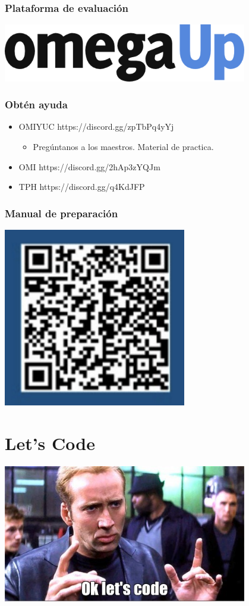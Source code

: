 \documentclass{beamer}
\begin{document}
\begin{frame}
  \frametitle{Plataforma de evaluación}
	\begin{center}
		\includegraphics[width=0.8\textwidth]{img/omegaup.png}
	\end{center}
\end{frame}

\begin{frame}
  \frametitle{Obtén ayuda}
	\begin{itemize}
		\item OMIYUC  https://discord.gg/zpTbPq4yYj 
		\begin{itemize}
			\item Pregúntanos a los maestros. Material de practica.
		\end{itemize}
		\item OMI https://discord.gg/2hAp3zYQJm
		\item TPH https://discord.gg/q4KdJFP
	\end{itemize}
\end{frame}

\begin{frame}
  \frametitle{Manual de preparación}
	\begin{center}
		\includegraphics[width=0.6\textwidth]{img/QR.jpg}
	\end{center}
\end{frame}

\section{Let's Code}

\begin{frame}
	\begin{center}
		\includegraphics[width=0.8\textwidth]{img/letscode.jpg}
	\end{center}
\end{frame}

\end{document}
